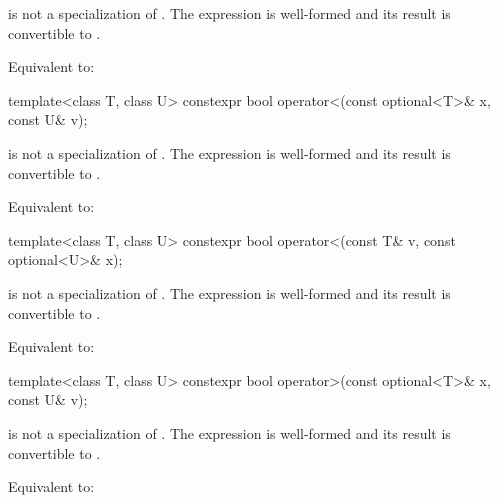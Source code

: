 \begin{itemdescr}
\pnum
\constraints
{} is not a specialization of .
The expression  is well-formed and
its result is convertible to .

\pnum
\effects
Equivalent to: 
\end{itemdescr}

%
\begin{itemdecl}
template<class T, class U> constexpr bool operator<(const optional<T>& x, const U& v);
\end{itemdecl}

\begin{itemdescr}
\pnum
\constraints
{} is not a specialization of .
The expression  is well-formed and
its result is convertible to .

\pnum
\effects
Equivalent to: 
\end{itemdescr}

%
\begin{itemdecl}
template<class T, class U> constexpr bool operator<(const T& v, const optional<U>& x);
\end{itemdecl}

\begin{itemdescr}
\pnum
\constraints
{} is not a specialization of .
The expression  is well-formed and
its result is convertible to .

\pnum
\effects
Equivalent to: 
\end{itemdescr}

%
\begin{itemdecl}
template<class T, class U> constexpr bool operator>(const optional<T>& x, const U& v);
\end{itemdecl}

\begin{itemdescr}
\pnum
\constraints
{} is not a specialization of .
The expression  is well-formed and
its result is convertible to .

\pnum
\effects
Equivalent to: 
\end{itemdescr}

